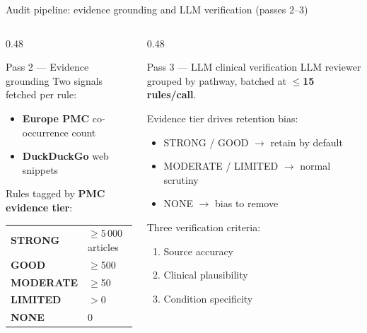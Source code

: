 \documentclass[aspectratio=169]{beamer}
\begin{document}
\begin{frame}{Audit pipeline: evidence grounding and LLM verification (passes 2--3)}
  \begin{columns}[T]
    \begin{column}{0.48\textwidth}
      \begin{block}{Pass 2 --- Evidence grounding}
        \small
        Two signals fetched per rule:
        \begin{itemize}
          \item \textbf{Europe PMC} co-occurrence count
          \item \textbf{DuckDuckGo} web snippets
        \end{itemize}
        \vspace{0.2em}
        Rules tagged by \textbf{PMC evidence tier}:
        \begin{center}
          \footnotesize
          \begin{tabular}{@{}ll@{}}
            \textbf{STRONG}   & $\geq$5\,000 articles \\
            \textbf{GOOD}     & $\geq$500 \\
            \textbf{MODERATE} & $\geq$50 \\
            \textbf{LIMITED}  & $>$0 \\
            \textbf{NONE}     & 0 \\
          \end{tabular}
        \end{center}
      \end{block}
    \end{column}
    \begin{column}{0.48\textwidth}
      \begin{block}{Pass 3 --- LLM clinical verification}
        \small
        LLM reviewer grouped by pathway, batched at \textbf{$\leq$15 rules/call}.

        \vspace{0.2em}
        Evidence tier drives retention bias:
        \begin{itemize}
          \item STRONG / GOOD $\to$ retain by default
          \item MODERATE / LIMITED $\to$ normal scrutiny
          \item NONE $\to$ bias to remove
        \end{itemize}

        \vspace{0.2em}
        Three verification criteria:
        \begin{enumerate}
          \item Source accuracy
          \item Clinical plausibility
          \item Condition specificity
        \end{enumerate}
      \end{block}
    \end{column}
  \end{columns}
\end{frame}
\end{document}
